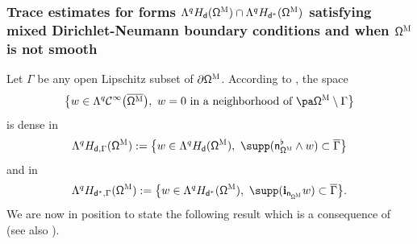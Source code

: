 \subsubsection*{Trace estimates for forms $ \Lambda^q H_{\mathsf d} (\mathsf \Omega^{\textsc{M}})\cap \Lambda^q H_{\mathsf d^*} (\mathsf \Omega^{\textsc{M}})$ satisfying mixed Dirichlet-Neumann boundary conditions and when $\mathsf \Omega^{\textsc{M}}$ is not smooth}
Let $\Gamma$ be any open Lipschitz subset of $\partial \mathsf \Omega^{\textsc{M}}$. According to \cite[Prop.\,3.1]{jakab-mitrea-mitrea-09},
the space
\[
\big \{w\in\Lambda^q\mathcal C^\infty\bigl(\overline{\mathsf \Omega^{\textsc{M}}}\bigr),\
w= 0 \text{ in a neighborhood of } \pa\mathsf \Omega^{\textsc{M}}\setminus \Gamma \big \}
\]
is dense in
\[
\Lambda^q H_{\mathsf d,\Gamma} (\mathsf \Omega^{\textsc{M}}):= \big \{w\in\Lambda^q H_{\mathsf d} (\mathsf \Omega^{\textsc{M}}),\
\supp(\mathsf n_{\mathsf \Omega^{\textsc{M}}}^{\flat} \wedge w)\subset \overline\Gamma \big \}
\]
and in
\[
\Lambda^q H_{\mathsf d^*,\Gamma} (\mathsf \Omega^{\textsc{M}}):= \big \{w\in\Lambda^q H_{\mathsf d^*} (\mathsf \Omega^{\textsc{M}}),\
\supp(\mathbf{i}_{\mathsf n_{\mathsf \Omega^{\textsc{M}}}} w)\subset \overline\Gamma \big \}.
\]
We are now in position to state the following result which is a consequence of \cite[Th.\,1.1 \&~1.2]{jakab-mitrea-mitrea-09} (see also \cite[Th.\,4.1 \&~4.2]{goldshtein-mitrea-mitrea-11}).

